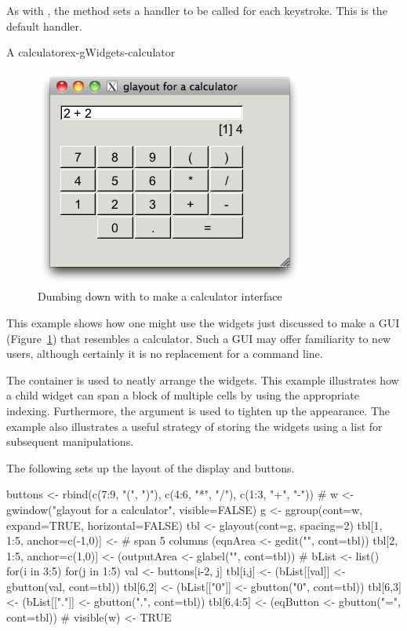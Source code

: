 As with , the  method
sets a handler to be called for each keystroke. This is the default
handler.


\begin{example}{A calculator}{ex-gWidgets-calculator}

\begin{figure}
  \centering
  \includegraphics[width=.6\textwidth]{fig-gWidgets-calculuator.png}
  \caption{Dumbing down \R{} with  to make a calculator interface}
  \label{fig:gwidgets-calculator}
\end{figure}

This example shows how one might use the widgets just discussed to
make a GUI (Figure~\ref{fig:gwidgets-calculator}) that resembles a
calculator. Such a GUI may offer familiarity to new \R\/ users,
although certainly it is no replacement for a command line.

The  container is used to neatly arrange the
widgets. This example illustrates how a child widget can span a block
of multiple cells by using the appropriate indexing. Furthermore, the
 argument is used to tighten up the appearance. The
example also illustrates a useful strategy of storing the widgets
using a list for subsequent manipulations.

The following sets up the layout of the display and buttons.
\begin{Schunk}
\begin{Sinput}
 buttons <- rbind(c(7:9, "(", ")"),
                  c(4:6, "*", "/"),
                  c(1:3, "+", "-"))
 #
 w <- gwindow("glayout for a calculator", visible=FALSE)
 g <- ggroup(cont=w, expand=TRUE, horizontal=FALSE)
 tbl <- glayout(cont=g, spacing=2)
 tbl[1, 1:5, anchor=c(-1,0)] <-          # span 5 columns
   (eqnArea <- gedit("", cont=tbl))
 tbl[2, 1:5, anchor=c(1,0)] <- 
   (outputArea <- glabel("", cont=tbl))
 #
 bList <- list()
 for(i in 3:5) {
   for(j in 1:5) {
     val <- buttons[i-2, j]
     tbl[i,j] <- (bList[[val]] <- gbutton(val, cont=tbl))
   }
 }
 tbl[6,2] <- (bList[["0"]] <- gbutton("0", cont=tbl))
 tbl[6,3] <- (bList[["."]] <- gbutton(".", cont=tbl))
 tbl[6,4:5] <- (eqButton <- gbutton("=", cont=tbl))
 #
 visible(w) <- TRUE
\end{Sinput}
\end{Schunk}


\end{example}
